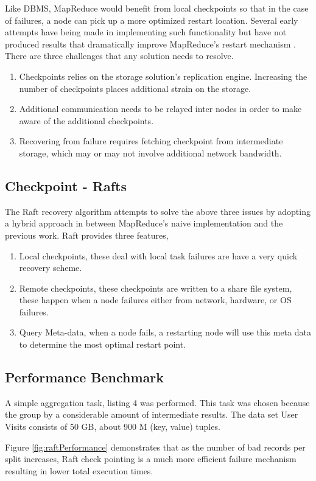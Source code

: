 \documentclass[10pt,twocolumn]{IEEEtran11}
\begin{document}
Like DBMS, MapReduce would benefit from local checkpoints so that in the case of failures, a node can pick up a more optimized restart location.  Several early attempts have being made in implementing such functionality but have not produced results that dramatically improve MapReduce's restart mechanism \cite{yang2010osprey}.  There are three challenges that any solution needs to resolve.
\  \\
\begin{enumerate}
	\setlength\itemsep{1em}
	\item Checkpoints relies on the storage solution's replication engine.  Increasing the number of checkpoints places additional strain on the storage.
	\item Additional communication needs to be relayed inter nodes in order to make aware of the additional checkpoints.
	\item Recovering from failure requires fetching checkpoint from intermediate storage, which may or may not involve additional network bandwidth.
\end{enumerate}

\subsection{Checkpoint - Rafts}

The Raft recovery algorithm attempts to solve the above three issues by adopting a hybrid approach in between MapReduce's naive implementation and the previous work.  Raft provides three features,
\  \\
\begin{enumerate}
	\setlength\itemsep{1em}
	\item Local checkpoints, these deal with local task failures are have a very quick recovery scheme.
	\item Remote checkpoints, these checkpoints are written to a share file system, these happen when a node failures either from network, hardware, or OS failures.
	\item Query Meta-data, when a node fails, a restarting node will use this meta data to determine the most optimal restart point.
\end{enumerate}


\subsection{Performance Benchmark}
A simple aggregation task, listing 4 was performed.  This task was chosen because the group by a considerable amount of intermediate results.  The data set User Visits consists of 50 GB, about 900 M (key, value) tuples.
\par
Figure \ref{fig:raftPerformance} demonstrates that as the number of bad records per split increases, Raft check pointing is a much more efficient failure mechanism resulting in lower total execution times. 
\end{document}
